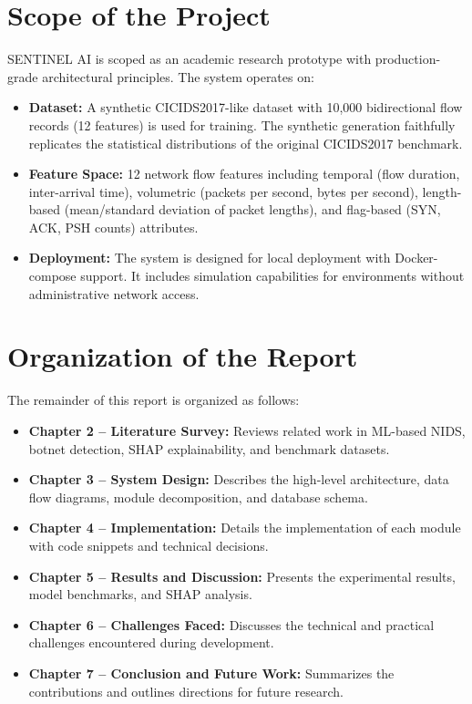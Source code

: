 \section{Scope of the Project}

SENTINEL AI is scoped as an academic research prototype with production-grade architectural principles. The system operates on:
\begin{itemize}
    \item \textbf{Dataset:} A synthetic CICIDS2017-like dataset with 10,000 bidirectional flow records (12 features) is used for training. The synthetic generation faithfully replicates the statistical distributions of the original CICIDS2017 benchmark.
    \item \textbf{Feature Space:} 12 network flow features including temporal (flow duration, inter-arrival time), volumetric (packets per second, bytes per second), length-based (mean/standard deviation of packet lengths), and flag-based (SYN, ACK, PSH counts) attributes.
    \item \textbf{Deployment:} The system is designed for local deployment with Docker-compose support. It includes simulation capabilities for environments without administrative network access.
\end{itemize}

\section{Organization of the Report}

The remainder of this report is organized as follows:

\begin{itemize}
    \item \textbf{Chapter 2 -- Literature Survey:} Reviews related work in ML-based NIDS, botnet detection, SHAP explainability, and benchmark datasets.
    \item \textbf{Chapter 3 -- System Design:} Describes the high-level architecture, data flow diagrams, module decomposition, and database schema.
    \item \textbf{Chapter 4 -- Implementation:} Details the implementation of each module with code snippets and technical decisions.
    \item \textbf{Chapter 5 -- Results and Discussion:} Presents the experimental results, model benchmarks, and SHAP analysis.
    \item \textbf{Chapter 6 -- Challenges Faced:} Discusses the technical and practical challenges encountered during development.
    \item \textbf{Chapter 7 -- Conclusion and Future Work:} Summarizes the contributions and outlines directions for future research.
\end{itemize}
